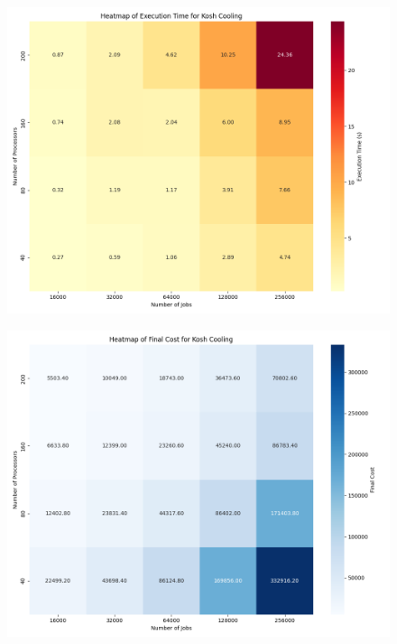 \documentclass[openany, twoside, a4paper, 12pt]{extbook}
\begin{document}
\begin{figure}[ht]
    \centering
    \begin{minipage}{0.49\textwidth}
        \centering
        \includegraphics[width=\textwidth]{results_solo/kosh_cooling_heatmap_execution_time.png}
        \label{fig:image3}
    \end{minipage}
    \hfill
    \begin{minipage}{0.49\textwidth}
        \centering
        \includegraphics[width=\textwidth]{results_solo/kosh_cooling_heatmap_final_cost.png}
        \label{fig:image4}
    \end{minipage}
    \vspace{-50pt} %
\end{figure}
\end{document}
